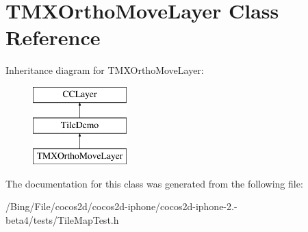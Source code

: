 \hypertarget{interface_t_m_x_ortho_move_layer}{\section{T\-M\-X\-Ortho\-Move\-Layer Class Reference}
\label{interface_t_m_x_ortho_move_layer}
}
Inheritance diagram for T\-M\-X\-Ortho\-Move\-Layer\-:\begin{figure}[H]
\begin{center}
\leavevmode
\includegraphics[height=3.000000cm]{interface_t_m_x_ortho_move_layer}
\end{center}
\end{figure}


The documentation for this class was generated from the following file\-:\begin{DoxyCompactItemize}
\item 
/\-Bing/\-File/cocos2d/cocos2d-\/iphone/cocos2d-\/iphone-\/2.-\/beta4/tests/Tile\-Map\-Test.\-h\end{DoxyCompactItemize}
